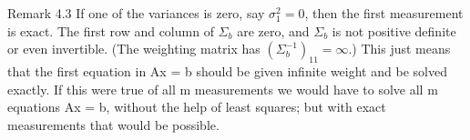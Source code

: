 	Remark 4.3 \;If one of the variances is zero, say $\sigma^2_1=0$, then the first measurement is
	exact. The first row and column of $\Sigma_b$ are zero, and $\Sigma_b$ is not positive definite or even invertible. (The weighting matrix has $(\Sigma^{-1}_b)_{11}=\infty$.) This just means that the first equation in Ax = b should be given infinite weight and be solved exactly. If this were true of all m measurements we would have to solve all m equations Ax = b, without the help of least squares; but with exact measurements that would be possible. 
	